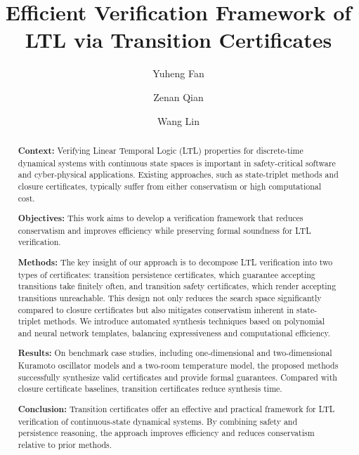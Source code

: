 ﻿\documentclass[a4paper,fleqn]{cas-sc}
\theoremstyle{definition}
\begin{document}
\let\WriteBookmarks\relax
\def\floatpagepagefraction{1}
\def\textpagefraction{.001}


\title[mode=title]{Efficient Verification Framework of LTL via Transition Certificates}

\author{Yuheng Fan}
\author{Zenan Qian}
\author{Wang Lin}
\cormark[1]



\begin{abstract}
\noindent\textbf{Context:} Verifying Linear Temporal Logic (LTL) properties for discrete-time dynamical systems with continuous state spaces is important in safety-critical software and cyber-physical applications. Existing approaches, such as state-triplet methods and closure certificates, typically suffer from either conservatism or high computational cost.\par
\noindent\textbf{Objectives:} This work aims to develop a verification framework that reduces conservatism and improves efficiency while preserving formal soundness for LTL verification.\par
\noindent\textbf{Methods:} The key insight of our approach is to decompose LTL verification into two types of certificates: transition persistence certificates, which guarantee accepting transitions take finitely often, and transition safety certificates, which render accepting transitions unreachable. This design not only reduces the search space significantly compared to closure certificates but also mitigates conservatism inherent in state-triplet methods. We introduce automated synthesis techniques based on polynomial and neural network templates, balancing expressiveness and computational efficiency.\par
\noindent\textbf{Results:} On benchmark case studies, including one-dimensional and two-dimensional Kuramoto oscillator models and a two-room temperature model, the proposed methods successfully synthesize valid certificates and provide formal guarantees. Compared with closure certificate baselines, transition certificates reduce synthesis time.\par
\noindent\textbf{Conclusion:} Transition certificates offer an effective and practical framework for LTL verification of continuous-state dynamical systems. By combining safety and persistence reasoning, the approach improves efficiency and reduces conservatism relative to prior methods.
\end{abstract}
\end{document}
